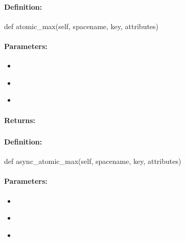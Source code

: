 \paragraph{Definition:}
\begin{pythoncode}
def atomic_max(self, spacename, key, attributes)
\end{pythoncode}

\paragraph{Parameters:}
\begin{itemize}[noitemsep]
\item {}\\

\item {}\\

\item {}\\

\end{itemize}

\paragraph{Returns:}


\pagebreak
\subsubsection{}
\label{api:python:async_atomic_max}


\paragraph{Definition:}
\begin{pythoncode}
def async_atomic_max(self, spacename, key, attributes)
\end{pythoncode}

\paragraph{Parameters:}
\begin{itemize}[noitemsep]
\item {}\\

\item {}\\

\item {}\\

\end{itemize}

